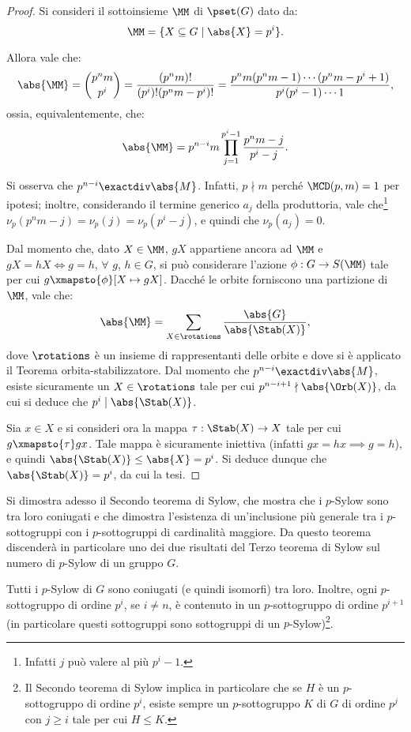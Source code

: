 \documentclass[12pt]{scrartcl}
\begin{document}
	\begin{proof}
		Si consideri il sottoinsieme $\MM$
		di $\pset(G)$ dato da:
		\[ \MM = \{ X \subseteq G \mid \abs{X} = p^i \}. \]


		Allora vale che:
		\[ \abs{\MM} = \binom{p^n m}{p^i} = \frac{(p^n m)!}{(p^i)! (p^n m - p^i)!} = \frac{p^n m (p^n m - 1) \cdots (p^n m - p^i + 1)}{p^i (p^i - 1) \cdots 1}, \]
		ossia, equivalentemente, che:
		\[ \abs{\MM} = p^{n-i} m \prod_{j=1}^{p^i - 1} \frac{p^n m - j}{p^i - j}. \]


		Si osserva che $p^{n-i} \exactdiv \abs{M}$. Infatti,
		$p \nmid m$ perché $\MCD(p, m) = 1$ per ipotesi; inoltre,
		considerando il termine generico $a_j$ della produttoria,
		vale che\footnote{
			Infatti $j$ può valere al più $p^i - 1$.
		} $\nu_p(p^n m - j) = \nu_p(j) = \nu_p(p^i - j)$,
		e quindi che $\nu_p(a_j) = 0$. \medskip
		
		
		Dal momento che, dato $X \in \MM$, $g X$ appartiene ancora
		ad $\MM$ e $g X = h X \iff g = h$, $\forall$ $g$, $h \in G$,
		si può considerare l'azione $\phi : G \to S(\MM)$
		tale per cui $g \xmapsto{\phi} [X \mapsto gX]$.
		Dacché le orbite forniscono una partizione di $\MM$,
		vale che:
		\[ \abs{\MM} = \sum_{X \in \rotations} \frac{\abs{G}}{\abs{\Stab(X)}}, \]
		dove $\rotations$ è un insieme di rappresentanti delle
		orbite e dove si è applicato il Teorema orbita-stabilizzatore.
		Dal momento che $p^{n-i} \exactdiv \abs{M}$, esiste
		sicuramente un $X \in \rotations$ tale per cui
		$p^{n-i+1} \nmid \abs{\Orb(X)}$, da cui si deduce che
		$p^i \mid \abs{\Stab(X)}$. \medskip
		
		
		Sia $x \in X$ e si consideri ora la mappa $\tau : \Stab(X) \to X$ tale per cui $g \xmapsto{\tau} gx$. Tale mappa è
		sicuramente iniettiva (infatti $gx = hx \implies g = h$),
		e quindi $\abs{\Stab(X)} \leq \abs{X} = p^i$. Si deduce
		dunque che $\abs{\Stab(X)} = p^i$, da cui la tesi.
	\end{proof} \bigskip
	

	Si dimostra adesso il Secondo teorema di Sylow, che mostra
	che i $p$-Sylow sono tra loro coniugati e che dimostra l'esistenza
	di un'inclusione più generale tra i $p$-sottogruppi con
	i $p$-sottogruppi di cardinalità maggiore. Da questo
	teorema discenderà in particolare uno dei due risultati
	del Terzo teorema di Sylow sul numero di $p$-Sylow di
	un gruppo $G$.

	\begin{theorem}
		Tutti i $p$-Sylow di $G$ sono coniugati (e quindi isomorfi)
		tra loro. Inoltre, ogni $p$-sottogruppo di ordine
		$p^i$, se $i \neq n$, è contenuto
		in un $p$-sottogruppo di ordine $p^{i+1}$ (in particolare
		questi sottogruppi sono sottogruppi di un $p$-Sylow)\footnote{
			Il Secondo teorema di Sylow implica in particolare
			che se $H$ è un $p$-sottogruppo di ordine $p^i$,
			esiste sempre un $p$-sottogruppo $K$ di $G$ di
			ordine $p^j$ con $j \geq i$ tale per cui
			$H \leq K$.
		}.
	\end{theorem}
	
\end{document}
